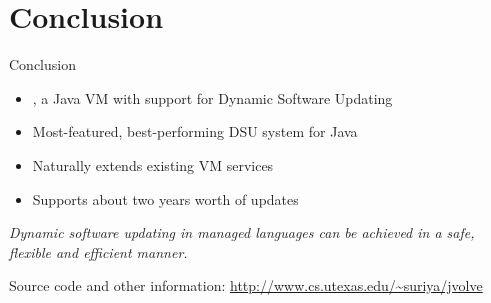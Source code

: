 \section{Conclusion}


\begin{frame}{Conclusion}%
\begin{itemize}
\item \DSU{}, a Java VM with support for Dynamic Software Updating
\item Most-featured, best-performing DSU system for Java
\item Naturally extends existing VM services
\item Supports about two years worth of updates
\end{itemize}
\begin{block}{}
\emph{Dynamic software updating in managed languages can be achieved in a
safe, flexible and efficient manner.}
\end{block}
\begin{center}
Source code and other information:
\url{http://www.cs.utexas.edu/~suriya/jvolve}
\end{center}
\end{frame}

